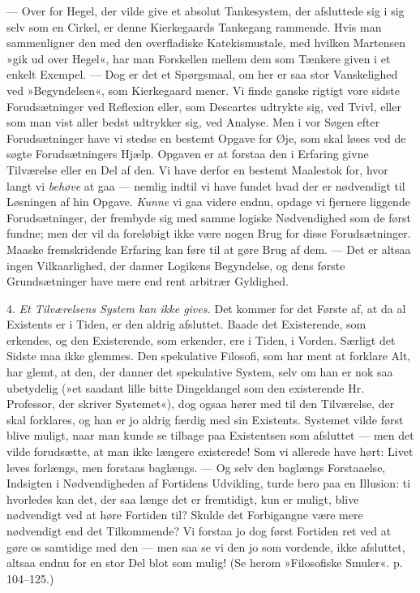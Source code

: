 \documentclass[12pt,a4paper,openany]{book}
\newcommand{\opage}[1]{\marginnote{\footnotesize\textit{[#1]}}}
\begin{document}
--- Over for Hegel, der vilde give et absolut Tankesystem,
der afsluttede sig i sig selv som en Cirkel, er
denne Kierkegaards Tankegang rammende. Hvis man
\opage{62}sammenligner den med den overfladiske Katekismustale,
med hvilken Martensen »gik ud over Hegel«, har man
Forskellen mellem dem som Tænkere given i et enkelt
Exempel. --- Dog er det et Spørgsmaal, om her er saa
stor Vanskelighed ved »Begyndelsen«, som Kierkegaard
mener. Vi finde ganske rigtigt vore sidste Forudsætninger
ved Reflexion eller, som Descartes udtrykte sig, ved
Tvivl, eller som man vist aller bedst udtrykker sig, ved
Analyse. Men i vor Søgen efter Forudsætninger have
vi stedse en bestemt Opgave for Øje, som skal løses
ved de søgte Forudsætningers Hjælp. Opgaven er at
forstaa den i Erfaring givne Tilværelse eller en Del af
den. Vi have derfor en bestemt Maalestok for, hvor
langt vi \textit{behøve} at gaa --- nemlig indtil vi have fundet
hvad der er nødvendigt til Løsningen af hin Opgave.
\textit{Kunne} vi gaa videre endnu, opdage vi fjernere liggende
Forudsætninger, der frembyde sig med samme logiske
Nødvendighed som de først fundne; men der vil da foreløbigt
ikke være nogen Brug for disse Forudsætninger.
Maaske fremskridende Erfaring kan føre til at gøre Brug
af dem. --- Det er altsaa ingen Vilkaarlighed, der danner
Logikens Begyndelse, og dens første Grundsætninger have
mere end rent arbitrær Gyldighed.

4. \textit{Et Tilværelsens System kan ikke gives.} Det
kommer for det Første af, at da al Existents er i Tiden,
er den aldrig afsluttet. Baade det Existerende, som erkendes,
og den Existerende, som erkender, ere i Tiden,
i Vorden. Særligt det Sidste maa ikke glemmes. Den
spekulative Filosofi, som har ment at forklare Alt, har
glemt, at den, der danner det spekulative System, selv
om han er nok saa ubetydelig (»et saadant lille bitte
Dingeldangel som den existerende Hr. Professor, der
skriver Systemet«), dog ogsaa hører med til den Tilværelse,
der skal forklares, og han er jo aldrig færdig
\opage{63}med sin Existents. Systemet vilde først blive muligt,
naar man kunde se tilbage paa Existentsen som afsluttet
--- men det vilde forudsætte, at man ikke længere existerede!
Som vi allerede have hørt: Livet leves forlængs,
men forstaas baglængs. --- Og selv den baglængs Forstaaelse,
Indsigten i Nødvendigheden af Fortidens Udvikling,
turde bero paa en Illusion: ti hvorledes kan det,
der saa længe det er fremtidigt, kun er muligt, blive
nødvendigt ved at høre Fortiden til? Skulde det Forbigangne
være mere nødvendigt end det Tilkommende?
Vi forstaa jo dog først Fortiden ret ved at gøre os samtidige
med den --- men saa se vi den jo som vordende,
ikke afsluttet, altsaa endnu for en stor Del blot som
mulig! (Se herom »Filosofiske Smuler«. p. 104--125.)
\end{document}

